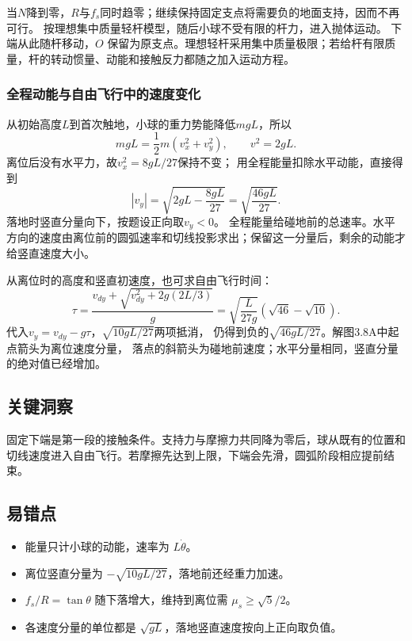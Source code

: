 \documentclass[UTF8,fontset=fandol,a4paper,11pt]{ctexart}
\begin{document}
当$N$降到零，$R$与$f_s$同时趋零；继续保持固定支点将需要负的地面支持，因而不再可行。
按理想集中质量轻杆模型，随后小球不受有限的杆力，进入抛体运动。
下端从此随杆移动，$O$ 保留为原支点。理想轻杆采用集中质量极限；若给杆有限质量，杆的转动惯量、动能和接触反力都随之加入运动方程。

\subsubsection*{全程动能与自由飞行中的速度变化}
从初始高度$L$到首次触地，小球的重力势能降低$mgL$，所以
\[
mgL=\frac12m(v_x^2+v_y^2),\qquad v^2=2gL.
\]
离位后没有水平力，故$v_x^2=8gL/27$保持不变；
用全程能量扣除水平动能，直接得到
\[
|v_y|=\sqrt{2gL-\frac{8gL}{27}}
=\sqrt{\frac{46gL}{27}}.
\]
落地时竖直分量向下，按题设正向取$v_y<0$。
全程能量给碰地前的总速率。水平方向的速度由离位前的圆弧速率和切线投影求出；保留这一分量后，剩余的动能才给竖直速度大小。

从离位时的高度和竖直初速度，也可求自由飞行时间：
\[
\tau=\frac{v_{dy}+\sqrt{v_{dy}^2+2g(2L/3)}}g
=\sqrt{\frac L{27g}}(\sqrt{46}-\sqrt{10}).
\]
代入$v_y=v_{dy}-g\tau$，$\sqrt{10gL/27}$两项抵消，
仍得到负的$\sqrt{46gL/27}$。解图3.8A中起点箭头为离位速度分量，
落点的斜箭头为碰地前速度；水平分量相同，竖直分量的绝对值已经增加。




\subsection*{关键洞察}

固定下端是第一段的接触条件。支持力与摩擦力共同降为零后，球从既有的位置和切线速度进入自由飞行。若摩擦先达到上限，下端会先滑，圆弧阶段相应提前结束。



\subsection*{易错点}

\begin{itemize}
\item 能量只计小球的动能，速率为 $L\dot\theta$。
\item 离位竖直分量为 $-\sqrt{10gL/27}$，落地前还经重力加速。
\item $f_s/R=\tan\theta$ 随下落增大，维持到离位需 $\mu_s\geq\sqrt5/2$。
\item 各速度分量的单位都是 $\sqrt{gL}$，落地竖直速度按向上正向取负值。
\end{itemize}
\end{document}
